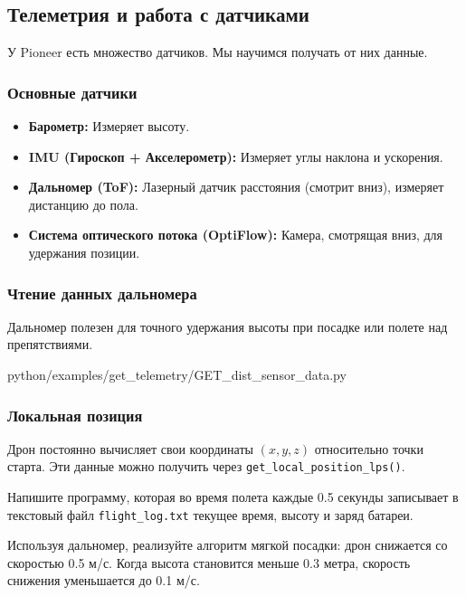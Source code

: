 \subsection{Телеметрия и работа с датчиками}

У Pioneer есть множество датчиков. Мы научимся получать от них данные.

\subsubsection*{Основные датчики}
\begin{itemize}
    \item \textbf{Барометр:} Измеряет высоту.
    \item \textbf{IMU (Гироскоп + Акселерометр):} Измеряет углы наклона и ускорения.
    \item \textbf{Дальномер (ToF):} Лазерный датчик расстояния (смотрит вниз), измеряет дистанцию до пола.
    \item \textbf{Система оптического потока (OptiFlow):} Камера, смотрящая вниз, для удержания позиции.
\end{itemize}

\subsubsection*{Чтение данных дальномера}
Дальномер полезен для точного удержания высоты при посадке или полете над препятствиями.

\begin{codefile}[python]{python/examples/get_telemetry/GET_dist_sensor_data.py}
\end{codefile}

\subsubsection*{Локальная позиция}
Дрон постоянно вычисляет свои координаты $(x, y, z)$ относительно точки старта. Эти данные можно получить через \texttt{get\_local\_position\_lps()}.

\begin{taskbox}
Напишите программу, которая во время полета каждые 0.5 секунды записывает в текстовый файл \texttt{flight\_log.txt} текущее время, высоту и заряд батареи.
\end{taskbox}

\begin{taskbox}
Используя дальномер, реализуйте алгоритм мягкой посадки: дрон снижается со скоростью 0.5 м/с. Когда высота становится меньше 0.3 метра, скорость снижения уменьшается до 0.1 м/с.
\end{taskbox}
